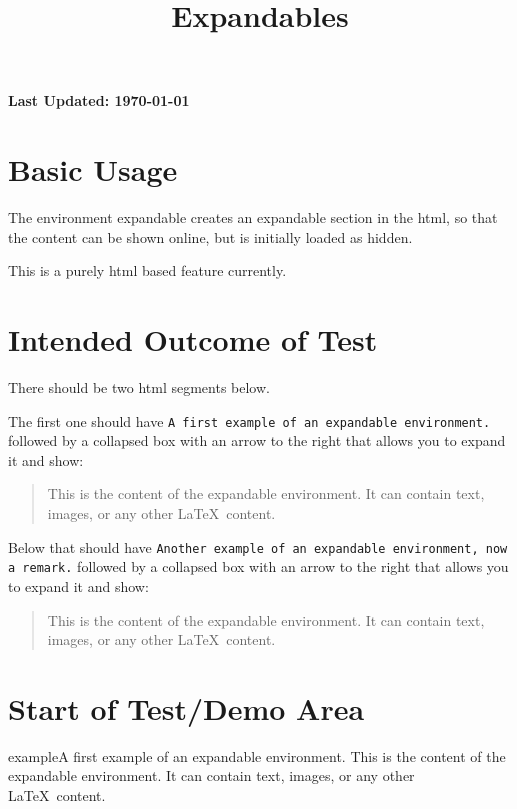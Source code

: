 \documentclass{ximera}
\title{Expandables}
\begin{document}
\begin{abstract}
\end{abstract}
\maketitle

{{\Huge \bfseries Last Updated: \today}} \\

\section{Basic Usage}

The environment expandable creates an expandable section in the html, so that the content can be shown online, but is initially loaded as hidden.

This is a purely html based feature currently.

\section{Intended Outcome of Test}

There should be two html segments below. 

The first one should have \texttt{A first example of an expandable environment.} followed by 
a collapsed box with an arrow to the right that allows you to expand it and show: 
\begin{quote}
This is the content of the expandable environment. It can contain text, images, or any other \LaTeX\ content.
\end{quote}

Below that should have \texttt{Another example of an expandable environment, now a remark.} followed by 
a collapsed box with an arrow to the right that allows you to expand it and show: 
\begin{quote}
This is the content of the expandable environment. It can contain text, images, or any other \LaTeX\ content.
\end{quote}


\section{Start of Test/Demo Area}

\begin{expandable}{example}{A first example of an expandable environment.}
This is the content of the expandable environment. It can contain text, images, or any other \LaTeX\ content.
\end{expandable}
\end{document}
